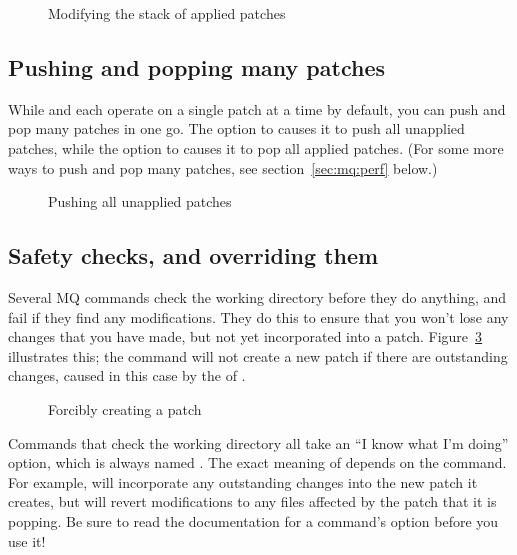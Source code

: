 \begin{figure}[ht]
  \caption{Modifying the stack of applied patches}
  \label{ex:mq:qpop}
\end{figure}

\subsection{Pushing and popping many patches}

While  and  each operate on a single patch at
a time by default, you can push and pop many patches in one go.  The
 option to  causes it to push all
unapplied patches, while the  option to 
causes it to pop all applied patches.  (For some more ways to push and
pop many patches, see section~\ref{sec:mq:perf} below.)

\begin{figure}[ht]
  \caption{Pushing all unapplied patches}
  \label{ex:mq:qpush-a}
\end{figure}

\subsection{Safety checks, and overriding them}

Several MQ commands check the working directory before they do
anything, and fail if they find any modifications.  They do this to
ensure that you won't lose any changes that you have made, but not yet
incorporated into a patch.  Figure~\ref{ex:mq:add} illustrates this;
the  command will not create a new patch if there are
outstanding changes, caused in this case by the  of
.

\begin{figure}[ht]
  \caption{Forcibly creating a patch}
  \label{ex:mq:add}
\end{figure}

Commands that check the working directory all take an ``I know what
I'm doing'' option, which is always named .  The exact
meaning of  depends on the command.  For example,
 will incorporate any outstanding
changes into the new patch it creates, but
 will revert modifications to any
files affected by the patch that it is popping.  Be sure to read the
documentation for a command's  option before you use it!

